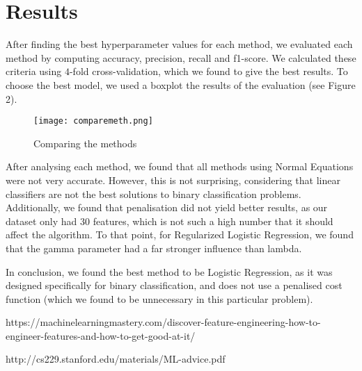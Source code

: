 \documentclass{article}
\begin{document}
	
	
	\section{Results}
	After finding the best hyperparameter values for each method, we evaluated each method by computing accuracy, precision, recall and f1-score. We calculated these criteria using $4$-fold cross-validation, which we found to give the best results. To choose the best model, we used a boxplot the results of the evaluation (see Figure 2).
	
	\begin{figure}[h]
		\centering
		\texttt{[image: comparemeth.png]}
		\caption{Comparing the methods}
	\end{figure}

	After analysing each method, we found that all methods using Normal Equations were not very accurate. However, this is not surprising, considering that linear classifiers are not the best solutions to binary classification problems. Additionally, we found that penalisation did not yield better results, as our dataset only had $30$ features, which is not such a high number that it should affect the algorithm. To that point, for Regularized Logistic Regression, we found that the gamma parameter had a far stronger influence than lambda.
	
	In conclusion, we found the best method to be Logistic Regression, as it was designed specifically for binary classification, and does not use a penalised cost function (which we found to be unnecessary in this particular problem).
	
	\begin{thebibliography}{9}
		 https://machinelearningmastery.com/discover-feature-engineering-how-to-engineer-features-and-how-to-get-good-at-it/
		
		 http://cs229.stanford.edu/materials/ML-advice.pdf
	\end{thebibliography}
\end{document}
